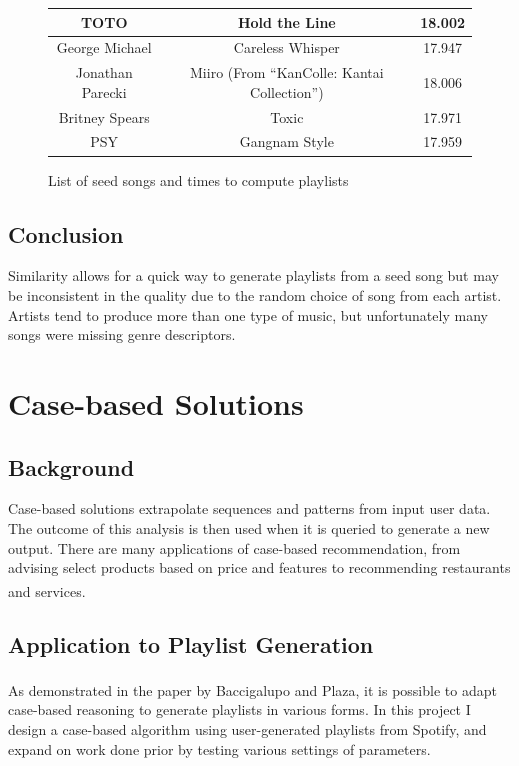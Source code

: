 \documentclass[a4paper, 12pt]{report}
\begin{document}
\begin{center}
    \begin{figure}[H]
        \begin{tabulary}{\linewidth}{|C|C|C|} 
            \hline
            TOTO & Hold the Line & 18.002 \\
            \hline
            George Michael & Careless Whisper & 17.947 \\
            \hline
            Jonathan Parecki & Miiro (From ``KanColle: Kantai Collection'') &  18.006 \\
            \hline
            Britney Spears & Toxic & 17.971 \\
            \hline
            PSY & Gangnam Style & 17.959 \\
            \hline
        \end{tabulary}
    \caption{List of seed songs and times to compute playlists}
    \end{figure}
\end{center}

\section{Conclusion}
Similarity allows for a quick way to generate playlists from a seed song but may be inconsistent in the quality due to the random choice of song from each artist.
Artists tend to produce more than one type of music, but unfortunately many songs were missing genre descriptors.

\chapter{Case-based Solutions}\label{chap:casesolutions}
\section{Background}
Case-based solutions extrapolate sequences and patterns from input user data.
The outcome of this analysis is then used when it is queried to generate a new output.
There are many applications of case-based recommendation, from advising select products based on price and features to recommending restaurants and services\textsuperscript{\cite{cbr-general}}.

\section{Application to Playlist Generation}
As demonstrated in the paper by Baccigalupo and Plaza\textsuperscript{\cite{main}}, it is possible to adapt case-based reasoning to generate playlists in various forms.
In this project I design a case-based algorithm using user-generated playlists from Spotify, and expand on work done prior by testing various settings of parameters.
\end{document}
